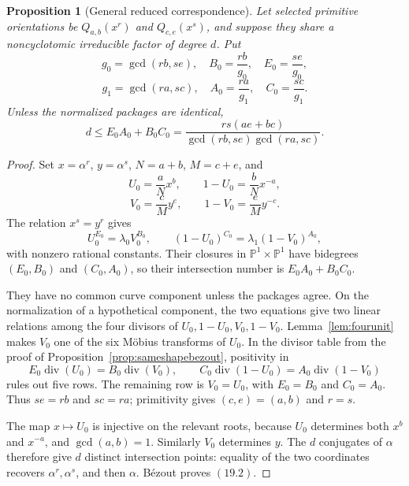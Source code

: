 \documentclass[11pt]{article}
\newtheorem{proposition}[theorem]{Proposition}
\theoremstyle{definition}
\begin{document}
\begin{proposition}[General reduced correspondence]
\label{prop:reducedcorrespondence}
Let selected primitive orientations be \(Q_{a,b}(x^r)\) and
\(Q_{c,e}(x^s)\), and suppose they share a noncyclotomic irreducible factor
of degree \(d\).  Put
\[
 g_0=\gcd(rb,se),\quad B_0=\frac{rb}{g_0},\quad E_0=\frac{se}{g_0},
\]
\[
 g_1=\gcd(ra,sc),\quad A_0=\frac{ra}{g_1},\quad C_0=\frac{sc}{g_1}.
\]
Unless the normalized packages are identical,
\begin{equation}
 \boxed{d\leq E_0A_0+B_0C_0
 =\frac{rs(ae+bc)}{\gcd(rb,se)\gcd(ra,sc)}.}
 \tag{19.2}
\end{equation}
\end{proposition}

\begin{proof}
Set \(x=\alpha^r\), \(y=\alpha^s\), \(N=a+b\), \(M=c+e\), and
\[
 U_0=\frac aN x^b,\qquad 1-U_0=\frac bN x^{-a},
\]
\[
 V_0=\frac cM y^e,\qquad 1-V_0=\frac eM y^{-c}.
\]
The relation \(x^s=y^r\) gives
\begin{equation}
 U_0^{E_0}=\lambda_0V_0^{B_0},
 \qquad
 (1-U_0)^{C_0}=\lambda_1(1-V_0)^{A_0},
 \tag{19.3}
\end{equation}
with nonzero rational constants.  Their closures in
\(\mathbb P^1\times\mathbb P^1\) have bidegrees
\((E_0,B_0)\) and \((C_0,A_0)\), so their intersection number is
\(E_0A_0+B_0C_0\).

They have no common curve component unless the packages agree.  On the
normalization of a hypothetical component, the two equations give two
linear relations among the four divisors of
\(U_0,1-U_0,V_0,1-V_0\).  Lemma~\ref{lem:fourunit} makes \(V_0\) one of
the six M\"obius transforms of \(U_0\).  In the divisor table from the proof
of Proposition~\ref{prop:sameshapebezout}, positivity in
\[
 E_0\operatorname{div}(U_0)=B_0\operatorname{div}(V_0),\qquad
 C_0\operatorname{div}(1-U_0)=
 A_0\operatorname{div}(1-V_0)
\]
rules out five rows.  The remaining row is \(V_0=U_0\), with
\(E_0=B_0\) and \(C_0=A_0\).  Thus \(se=rb\) and \(sc=ra\);
primitivity gives \((c,e)=(a,b)\) and \(r=s\).

The map \(x\mapsto U_0\) is injective on the relevant roots, because \(U_0\)
determines both \(x^b\) and \(x^{-a}\), and \(\gcd(a,b)=1\).  Similarly
\(V_0\) determines \(y\).  The \(d\) conjugates of \(\alpha\) therefore
give \(d\) distinct intersection points: equality of the two coordinates
recovers \(\alpha^r,\alpha^s\), and then \(\alpha\).
B\'ezout proves \((19.2)\).
\end{proof}
\end{document}
